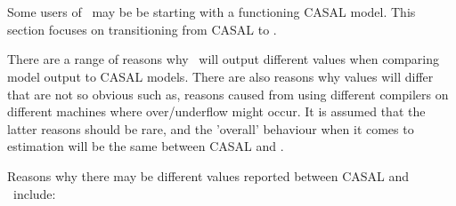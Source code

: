 \section{\label{sec:setupCasal2}}

Some users of \CNAME\ may be be starting with a functioning CASAL model. This section focuses on transitioning from CASAL to \CNAME.

There are a range of reasons why \CNAME\ will output different values when comparing model output to CASAL models. There are also reasons why values will differ that are not so obvious such as, reasons caused from using different compilers on different machines where over/underflow might occur. It is assumed that the latter reasons  should be rare, and the 'overall' behaviour when it comes to estimation will be the same between CASAL and \CNAME.

Reasons why there may be different values reported between CASAL and \CNAME\ include:

